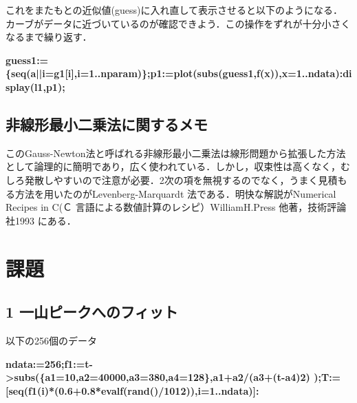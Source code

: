 \documentclass{article}
\begin{document}
\begin{maplegroup}
\begin{Maple Normal}{
これをまたもとの近似値(guess)に入れ直して表示させると以下のようになる．カーブがデータに近づいているのが確認できよう．この操作をずれが十分小さくなるまで繰り返す．}\end{Maple Normal}

\textbf{guess1:=\{seq(a||i=g1[i],i=1..nparam)\};}\textbf{p1:=plot(subs(guess1,f(x)),x=1..ndata):}\textbf{display(l1,p1);}\textbf{}\mapleresult
\begin{maplelatex}
\end{maplelatex}
\mapleresult
{}
\end{maplegroup}
\subsection{\textbf{非線形最小二乗法に関するメモ}}
\begin{maplegroup}
\begin{Maple Normal}{
このGauss-Newton法と呼ばれる非線形最小二乗法は線形問題から拡張した方法として論理的に簡明であり，広く使われている．しかし，収束性は高くなく，むしろ発散しやすいので注意が必要．2次の項を無視するのでなく，うまく見積もる方法を用いたのがLevenberg-Marquardt 法である．明快な解説がNumerical Recipes in C(Ｃ 言語による数値計算のレシピ）WilliamH.Press 他著，技術評論社1993 にある．}\end{Maple Normal}

\end{maplegroup}
\section{\textbf{課題}}
\subsection{\textbf{1 一山ピークへのフィット}}
\begin{maplegroup}
\begin{Maple Normal}{
以下の256個のデータ}\end{Maple Normal}

\textbf{ndata:=256;}\textbf{f1:=t->subs(\{a1=10,a2=40000,a3=380,a4=128\},a1+a2/(a3+(t-a4)2) );}\textbf{T:=[seq(f1(i)*(0.6+0.8*evalf(rand()/1012)),i=1..ndata)]:}\end{maplegroup}
\begin{maplegroup}
\begin{mapleinput}
\end{mapleinput}
\end{maplegroup}
\end{document}
